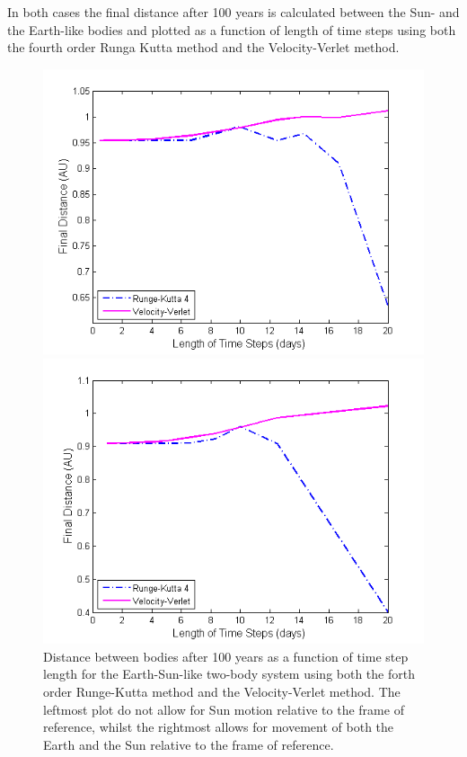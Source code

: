 In both cases the final distance after 100 years is calculated between the Sun- and the Earth-like bodies and plotted as a function of length of time steps using both the fourth order Runga Kutta method and the Velocity-Verlet method. 
\begin{figure}[H]
\centering
\begin{minipage}{.5\textwidth}
  \centering
  \includegraphics[width=1\linewidth]{Figures/Test_2body_system_earth.png}
\end{minipage}%
\begin{minipage}{.5\textwidth}
  \centering
  \includegraphics[width=1\linewidth]{Figures/Test_2body_system_earth_sun.png}
\end{minipage}
\caption{
Distance between bodies after 100 years as a function of time step length for the Earth-Sun-like two-body system using both the forth order Runge-Kutta method and the Velocity-Verlet method. 
The leftmost plot do not allow for Sun motion relative to the frame of reference, whilst the rightmost allows for movement of both the Earth and the Sun relative to the frame of reference.
}
\label{fig:SunEarthMarsTest}
\end{figure}
